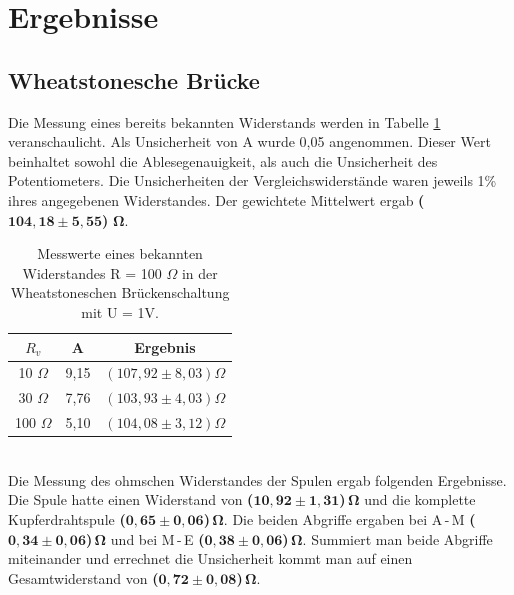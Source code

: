 \documentclass[a4paper,usenatbib]{aspdoc}
\begin{document}
            
    
    \section{Ergebnisse}\label{sec:result}
        
        \subsection{Wheatstonesche Brücke}\label{subsec:result_wheatstone}
            Die Messung eines bereits bekannten Widerstands werden in Tabelle \ref{tab:mewh} veranschaulicht. Als Unsicherheit von A wurde 0,05 angenommen. Dieser Wert beinhaltet sowohl die Ablesegenauigkeit, als auch die Unsicherheit des Potentiometers. Die Unsicherheiten der Vergleichswiderstände waren jeweils 1\% ihres angegebenen Widerstandes. Der gewichtete Mittelwert ergab \textbf{(}$\mathbf{104,18 \pm 5,55}$\textbf{)} $\mathbf{\Omega}$. \\ 
            \begin{table}
                \centering
                \begin{tabular}{c|cc}
                    \multicolumn{1}{c}{$R_v$} & \multicolumn{1}{c}{A} & \multicolumn{1}{c}{Ergebnis}\\
                    \cmidrule(l){0-0}\cmidrule(lr){2-2}\cmidrule(lr){3-3}
                    \toprule
                    10 $\Omega$ & 9,15 & $(107,92 \pm 8,03) \Omega$ \\
                    30 $\Omega$ & 7,76 & $(103,93 \pm 4,03) \Omega $ \\
                    100 $\Omega$ & 5,10 & $(104,08 \pm 3,12) \Omega $ \\
                    \bottomrule
                \end{tabular}
                \caption{Messwerte eines bekannten Widerstandes R = 100 $\Omega$ in der Wheatstoneschen Brückenschaltung mit U = 1\si{\volt}.}
                \label{tab:mewh}
            \end{table}
            \\
            Die Messung des ohmschen Widerstandes der Spulen ergab folgenden Ergebnisse.\\
            Die Spule hatte einen Widerstand von \textbf{(}$\mathbf{10,92 \pm 1,31}$\textbf{)}$\,\mathbf{\Omega}$ und die komplette Kupferdrahtspule \textbf{(}$\mathbf{0,65 \pm 0,06}$\textbf{)}$\,\mathbf{\Omega}$. Die beiden Abgriffe ergaben bei A\,-\,M \textbf{(}$\mathbf{0,34 \pm 0,06}$\textbf{)}$\,\mathbf{\Omega}$ und bei M\,-\,E \textbf{(}$\mathbf{0,38 \pm 0,06}$\textbf{)}$\,\mathbf{\Omega}$. Summiert man beide Abgriffe miteinander und errechnet die Unsicherheit kommt man auf einen Gesamtwiderstand von \textbf{(}$\mathbf{0,72 \pm 0,08}$\textbf{)}$\,\mathbf{\Omega}$.\\
\end{document}
